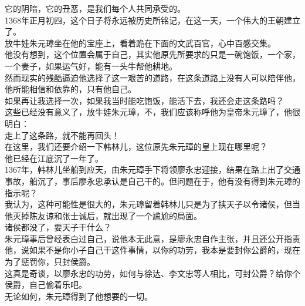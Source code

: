 \begin{multicols}{\theparacolNo}
它的阴暗，它的丑恶，是我们每个人共同承受的。\\

1368年正月初四，这个日子将永远被历史所铭记，在这一天，一个伟大的王朝建立了。\\

放牛娃朱元璋坐在他的宝座上，看着跪在下面的文武百官，心中百感交集。\\

他没有想到，这个位置会属于自己，其实他原先所要求的只是一碗饱饭，一个家，一个妻子，如果运气好，能有一头牛帮他耕地。\\

然而现实的残酷逼迫他选择了这一艰苦的道路，在这条道路上没有人可以陪伴他，他所能相信和依靠的，只有他自己。\\

如果再让我选择一次，如果我当时能吃饱饭，能活下去，我还会走这条路吗？\\

这些已经没有意义了，放牛娃朱元璋，不，我们应该称呼他为皇帝朱元璋了，他很明白：\\

走上了这条路，就不能再回头！\\

在这里，我们还要介绍一下韩林儿，这位原先朱元璋的皇上现在哪里呢？\\

他已经在江底沉了一年了。\\

1367年，韩林儿坐船到应天，由朱元璋手下将领廖永忠迎接，结果在路上出了交通事故，船沉了，事后廖永忠承认是自己干的。但问题在于，他有没有得到朱元璋的指示呢？\\

我认为，这种可能性是很大的，朱元璋留着韩林儿只是为了挟天子以令诸侯，但当他灭掉陈友谅和张士诚后，就出现了一个尴尬的局面。\\

诸侯都没了，要天子干什么？\\

朱元璋事后曾经表白过自己，说他本无此意，是廖永忠自作主张，并且还公开指责他，说如果不是你小子自己干这件事情，以你的功劳，我本是要封你公爵的，现在为了惩罚你，只封侯爵。\\

这真是奇谈，以廖永忠的功劳，如何与徐达、李文忠等人相比，可封公爵？给你个侯爵，自己偷着乐吧。\\

无论如何，朱元璋得到了他想要的一切。\\


\end{multicols}
